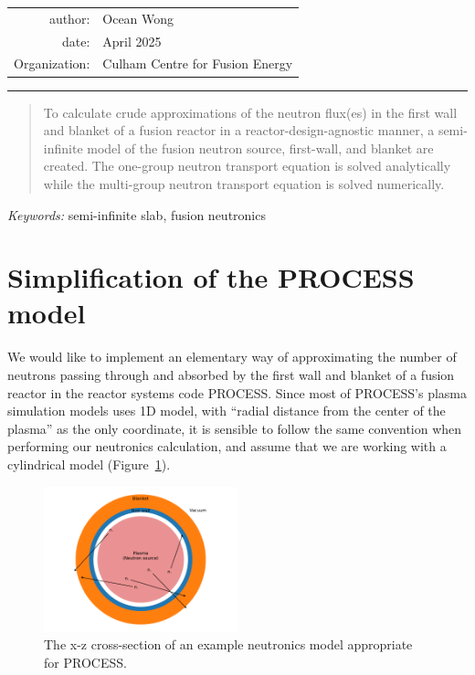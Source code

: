\documentclass[a4paper, 12pt]{article}
\begin{document}
    
\begin{table}[!h]
\centering
\begin{tabular}{rl}
author:&Ocean Wong          \\
date:  &April 2025       \\
Organization:&Culham Centre for Fusion Energy
\end{tabular}
\end{table}
\hrule
\begin{abstract}
    To calculate crude approximations of the neutron flux(es) in the first wall and blanket of a fusion reactor in a reactor-design-agnostic manner, a semi-infinite model of the fusion neutron source, first-wall, and blanket are created. The one-group neutron transport equation is solved analytically while the multi-group neutron transport equation is solved numerically.
\end{abstract}
\emph{Keywords:} semi-infinite slab, fusion neutronics

\section{Simplification of the PROCESS model}
We would like to implement an elementary way of approximating the number of neutrons passing through and absorbed by the first wall and blanket of a fusion reactor in the reactor systems code PROCESS. Since most of PROCESS's plasma simulation models uses 1D model, with ``radial distance from the center of the plasma'' as the only coordinate, it is sensible to follow the same convention when performing our neutronics calculation, and assume that we are working with a cylindrical model (Figure~\ref{fig:radial_plot}).
\begin{figure}[H]
\centering
\includegraphics[width=0.5\textwidth]{radial_plot.pdf} %
\caption{The x-z cross-section of an example neutronics model appropriate for PROCESS.} \label{fig:radial_plot}
\end{figure}
\end{document}
